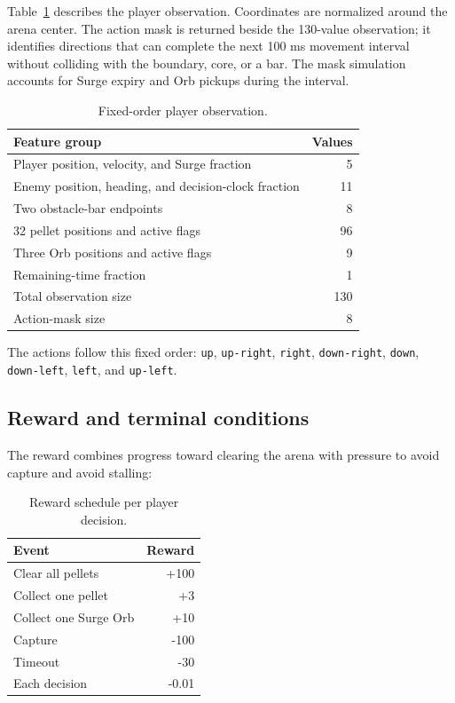 \documentclass[11pt]{article}
\begin{document}
Table~\ref{tab:observation} describes the player observation. Coordinates are
normalized around the arena center. The action mask is returned beside the
130-value observation; it identifies directions that can complete the next
100 ms movement interval without colliding with the boundary, core, or a bar.
The mask simulation accounts for Surge expiry and Orb pickups during the
interval.

\begin{table}[ht]
\centering
\caption{Fixed-order player observation.}
\label{tab:observation}
\begin{tabular}{lr}
\toprule
Feature group & Values \\
\midrule
Player position, velocity, and Surge fraction & 5 \\
Enemy position, heading, and decision-clock fraction & 11 \\
Two obstacle-bar endpoints & 8 \\
32 pellet positions and active flags & 96 \\
Three Orb positions and active flags & 9 \\
Remaining-time fraction & 1 \\
\midrule
Total observation size & 130 \\
Action-mask size & 8 \\
\bottomrule
\end{tabular}
\end{table}

The actions follow this fixed order:
\texttt{up}, \texttt{up-right}, \texttt{right}, \texttt{down-right},
\texttt{down}, \texttt{down-left}, \texttt{left}, and \texttt{up-left}.

\subsection{Reward and terminal conditions}

The reward combines progress toward clearing the arena with pressure to avoid
capture and avoid stalling:

\begin{table}[ht]
\centering
\caption{Reward schedule per player decision.}
\label{tab:rewards}
\begin{tabular}{lr}
\toprule
Event & Reward \\
\midrule
Clear all pellets & +100 \\
Collect one pellet & +3 \\
Collect one Surge Orb & +10 \\
Capture & -100 \\
Timeout & -30 \\
Each decision & -0.01 \\
\bottomrule
\end{tabular}
\end{table}
\end{document}
